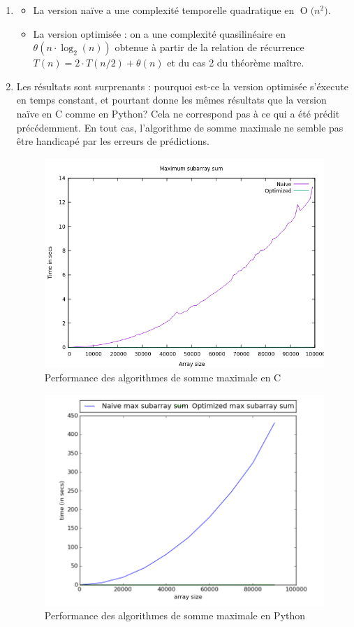 \documentclass[paper=a4, fontsize=11pt]{scrartcl}
\numberwithin{equation}{section}		%
\numberwithin{figure}{section}			%
\numberwithin{table}{section}				%
\newcommand{\BigO}[1]{\ensuremath{\operatorname{O}\bigl(#1\bigr)}}
\begin{document}
\begin{enumerate}
   	\item
\begin{itemize}
\item La version naïve a une complexité temporelle quadratique en \BigO{n^2}.
\item La version optimisée : on a une complexité quasilinéaire en $\theta ( n \cdot \log _2 \left( n \right ) )$ obtenue
à partir de la relation de récurrence $ T(n) = 2 \cdot T(n/2) + \theta (n)$ et du cas 2 du théorème maître.
\end{itemize}

   	\item Les résultats sont surprenants : pourquoi est-ce la version optimisée s'éxecute en temps constant,
et pourtant donne les mêmes résultats que la version naïve en C comme en Python?
Cela ne correspond pas à ce qui a été prédit précédemment.
En tout cas, l'algorithme de somme maximale ne semble pas être handicapé par les erreurs de prédictions.

\begin{figure}[h]
  \caption{Performance des algorithmes de somme maximale en C}
\centering\includegraphics[width=1\textwidth]{subarray100k_c.png}
\end{figure}

\begin{figure}[h]
  \caption{Performance des algorithmes de somme maximale en Python}
\centering\includegraphics[width=1\textwidth]{subarray100k_py.png}
\end{figure}


\end{enumerate}
\end{document}
